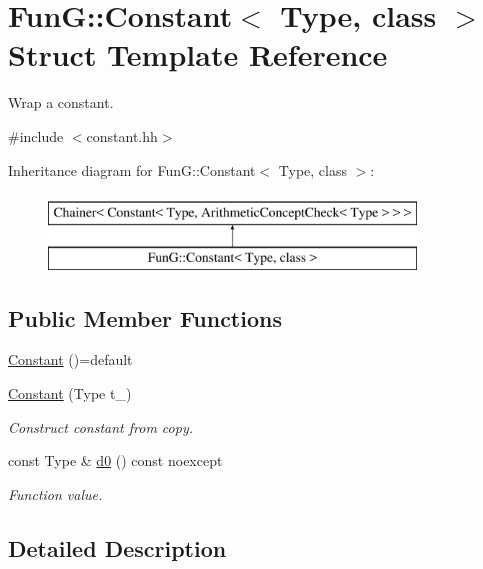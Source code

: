 \hypertarget{structFunG_1_1Constant}{\section{Fun\-G\-:\-:Constant$<$ Type, class $>$ Struct Template Reference}
\label{structFunG_1_1Constant}
}


Wrap a constant.  




{\ttfamily \#include $<$constant.\-hh$>$}

Inheritance diagram for Fun\-G\-:\-:Constant$<$ Type, class $>$\-:\begin{figure}[H]
\begin{center}
\leavevmode
\includegraphics[height=2.000000cm]{structFunG_1_1Constant}
\end{center}
\end{figure}
\subsection*{Public Member Functions}
\begin{DoxyCompactItemize}
\item 
\hyperlink{structFunG_1_1Constant_a29ead8431e2fadfef397aae5dc5a4511}{Constant} ()=default
\item 
\hyperlink{structFunG_1_1Constant_aa01639e517f1224f3cbdc6b3542d8b97}{Constant} (Type t\-\_\-)
\begin{DoxyCompactList}\small\item\em Construct constant from copy. \end{DoxyCompactList}\item 
const Type \& \hyperlink{structFunG_1_1Constant_aad514a9470fbe1c47c0f07da6e160416}{d0} () const noexcept
\begin{DoxyCompactList}\small\item\em Function value. \end{DoxyCompactList}\end{DoxyCompactItemize}


\subsection{Detailed Description}
